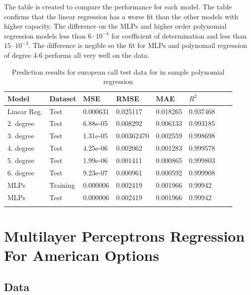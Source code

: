 The table is created to compare the performance for each model. The table confirms that the linear regression has a worse fit than the other models with higher capacity. The difference on the MLPs and higher order polynomial regression models less than $6\cdot 10^{-4}$ for coefficient of determination and less than $15 \cdot 10^{-3}$. The difference is negible so the fit for MLPs and polynomail regression of degree 4-6 performs all very well on the data.

\begin{table}[th]
\caption{Prediction results for european call test data for in sample polynomial regression}
\label{tab:euroPerformance}
\centering
\begin{tabular}{l l l l l l l l }
\toprule
\textbf{Model} & \textbf{Dataset} & \textbf{MSE} & \textbf{RMSE} & \textbf{MAE} & \textbf{$R^2$} \\
\midrule
Linear Reg. & Test & 0.000631 & 0.025117 & 0.018265 & 0.937468\\
2. degree & Test & 6.88e-05 & 0.008292 & 0.006133 & 0.993185\\
3. degree & Test & 1.31e-05 & 0.00362470 & 0.002559 & 0.998698\\
4. degree &Test & 4.25e-06 & 0.002062 & 0.001283 & 0.999578\\
5. degree & Test & 1.99e-06 & 0.001411 & 0.000865 & 0.999803\\
6. degree & Test & 9.23e-07 & 0.000961 & 0.000592 & 0.999908\\
MLPs & Training & 0.000006 & 0.002419 & 0.001966 & 0.99942\\
MLPs & Test & 0.000006 & 0.002419 & 0.001966 & 0.99942\\
\bottomrule\\
\end{tabular}
\end{table}

\section{Multilayer Perceptrons Regression For American Options}

\subsection{Data}


